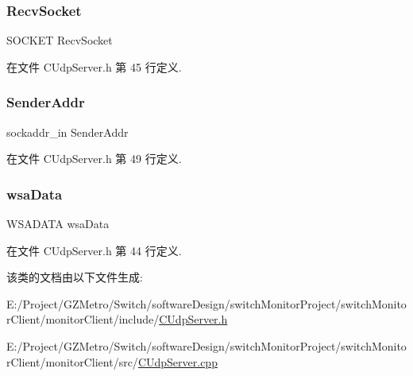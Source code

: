 \subsubsection{\texorpdfstring{Recv\+Socket}{RecvSocket}}
{\footnotesize\ttfamily S\+O\+C\+K\+ET Recv\+Socket\hspace{0.3cm}{\ttfamily [private]}}



在文件 C\+Udp\+Server.\+h 第 45 行定义.

\mbox{\label{class_c_udp_server_afa4f2f8a24a79e3423d13b07a005f387}} 
\subsubsection{\texorpdfstring{Sender\+Addr}{SenderAddr}}
{\footnotesize\ttfamily sockaddr\+\_\+in Sender\+Addr\hspace{0.3cm}{\ttfamily [private]}}



在文件 C\+Udp\+Server.\+h 第 49 行定义.

\mbox{\label{class_c_udp_server_a99d916e8fd71179b86cd135c2a27a905}} 
\subsubsection{\texorpdfstring{wsa\+Data}{wsaData}}
{\footnotesize\ttfamily W\+S\+A\+D\+A\+TA wsa\+Data\hspace{0.3cm}{\ttfamily [private]}}



在文件 C\+Udp\+Server.\+h 第 44 行定义.



该类的文档由以下文件生成\+:\begin{DoxyCompactItemize}
\item 
E\+:/\+Project/\+G\+Z\+Metro/\+Switch/software\+Design/switch\+Monitor\+Project/switch\+Monitor\+Client/monitor\+Client/include/\hyperlink{_c_udp_server_8h}{C\+Udp\+Server.\+h}\item 
E\+:/\+Project/\+G\+Z\+Metro/\+Switch/software\+Design/switch\+Monitor\+Project/switch\+Monitor\+Client/monitor\+Client/src/\hyperlink{_c_udp_server_8cpp}{C\+Udp\+Server.\+cpp}\end{DoxyCompactItemize}
